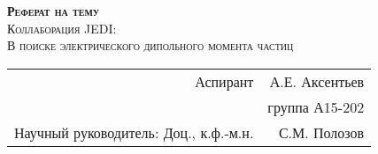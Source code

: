 
\begin{titlepage}
	\begin{center}
		
		
		\textsc{\textbf{Реферат на тему}}\\[2cm]
		
		\textsc{Коллаборация JEDI: \\ В поиске электрического дипольного момента частиц\\[2.4cm] }
		
		
		
	\end{center}
	
	
	\begin{flushright}
		\begin{tabular}{rr}
			Аспирант \underline{\hspace*{3cm}} & А.Е. Аксентьев \\
			&	группа А15-202 \\					
			Научный руководитель:          Доц., к.ф.-м.н. \underline{\hspace*{3cm}} & С.М. Полозов 	\\
		\end{tabular}
		
	\end{flushright}
	
	\vfill
	
	
	\begin{center}
		\the\year{}
	\end{center}
	
	
	
\end{titlepage}